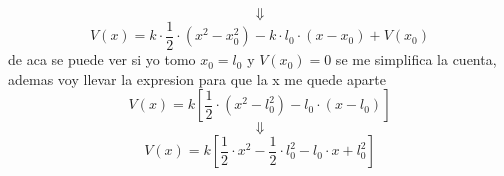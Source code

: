 \documentclass[../Main.tex]{subfiles}
\begin{document}
{\begin{equation*}
\end{equation*}
\begin{equation*}
    \Downarrow
\end{equation*}
\begin{equation*}
    V(x) = k \cdot \frac{1}{2} \cdot \left(x^2 - x_0^2 \right) - k \cdot l_0 \cdot \left( x - x_0 \right) + V(x_0) 
\end{equation*}
de aca se puede ver si yo tomo $x_0 = l_0$ y $V(x_0) = 0$ se me simplifica la
cuenta, ademas voy llevar la expresion para que la x me quede aparte
\begin{equation*}
    V(x) = k \left[ \frac{1}{2} \cdot \left(x^2 - l_0^2 \right) - l_0 \cdot \left( x - l_0 \right) \right]
\end{equation*}
\begin{equation*}
    \Downarrow
\end{equation*}
\begin{equation*}
    V(x) = k \left[ \frac{1}{2} \cdot x^2 - \frac{1}{2} \cdot l_0^2 - l_0 \cdot x + l_0^2 \right]
\end{equation*}

}
\end{document}
